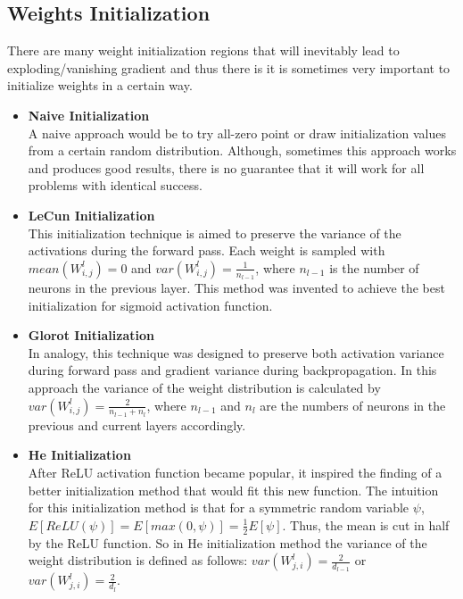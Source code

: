\subsection{Weights Initialization}
There are many weight initialization regions that will inevitably lead to exploding/vanishing gradient and thus there is it is sometimes very important to initialize weights in a certain way. \autocite{sun2020optimization}
\begin{itemize}
  \item \textbf{Naive Initialization} \\
    A naive approach would be to try all-zero point or draw initialization values from a certain random distribution. Although, sometimes this approach works and produces good results, there is no guarantee that it will work for all problems with identical success.
  \item \textbf{LeCun Initialization} \autocite{LeCun1998} \\
    This initialization technique is aimed to preserve the variance of the activations during the forward pass. Each weight is sampled with $mean(W_{i,j}^l) = 0$ and $var(W_{i,j}^l) = \frac{1}{n_{l-1}}$, where $n_{l-1}$ is the number of neurons in the previous layer. This method was invented to achieve the best initialization for sigmoid activation function.
  \item \textbf{Glorot Initialization} \autocite{glorot2010understanding} \\
    In analogy, this technique was designed to preserve both activation variance during forward pass and gradient variance during backpropagation. In this approach the variance of the weight distribution is calculated by $var(W_{i,j}^l) = \frac{2}{n_{l-1} + n_{l}}$, where $n_{l-1}$ and $n_{l}$ are the numbers of neurons in the previous and current layers accordingly.
  \item \textbf{He Initialization} \autocite{he2015delving} \\
    After ReLU activation function became popular, it inspired the finding of a better initialization method that would fit this new function. The intuition for this initialization method is that for a symmetric random variable $\psi$, $ E[ReLU(\psi)] = E[max(0, \psi)] = \frac{1}{2} E[\psi] $. Thus, the mean is cut in half by the ReLU function. So in He initialization method the variance of the weight distribution is defined as follows: $var(W_{j,i}^l) = \frac{2}{d_{l-1}}$ or $var(W_{j,i}^l) = \frac{2}{d_l}$.
\end{itemize}
